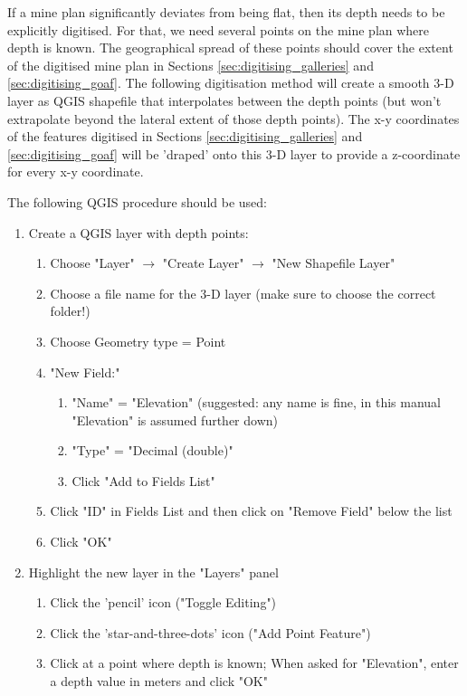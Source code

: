 If a mine plan significantly deviates from being flat, then its depth needs to be explicitly digitised. For that, we need several points on the mine plan where depth is known. The geographical spread of these points should cover the extent of the digitised mine plan in Sections \ref{sec:digitising_galleries} and \ref{sec:digitising_goaf}. The following digitisation method will create a smooth 3-D layer as QGIS shapefile that interpolates between the depth points (but won't extrapolate beyond the lateral extent of those depth points). The x-y coordinates of the features digitised in Sections \ref{sec:digitising_galleries} and \ref{sec:digitising_goaf} will be 'draped' onto this 3-D layer to provide a z-coordinate for every x-y coordinate. 

The following QGIS procedure should be used: 
\begin{enumerate}
    \item Create a QGIS layer with depth points: 
    \begin{enumerate}
        \item Choose "Layer" $\rightarrow$ "Create Layer" $\rightarrow$ "New Shapefile Layer"
        \item Choose a file name for the 3-D layer (make sure to choose the correct folder!)
        \item Choose Geometry type = Point
        \item "New Field:"
        \begin{enumerate}
            \item "Name" = "Elevation" (suggested: any name is fine, in this manual "Elevation" is assumed further down)
            \item "Type" = "Decimal (double)"
            \item Click "Add to Fields List"
        \end{enumerate}
        \item Click "ID" in Fields List and then click on "Remove Field" below the list
        \item Click "OK"
    \end{enumerate}
    \item Highlight the new layer in the "Layers" panel
    \begin{enumerate}
        \item Click the 'pencil' icon ("Toggle Editing")
        \item Click the 'star-and-three-dots' icon ("Add Point Feature")
        \item Click at a point where depth is known; When asked for "Elevation", enter a depth value in meters and click "OK"

\end{enumerate}
\end{enumerate}
